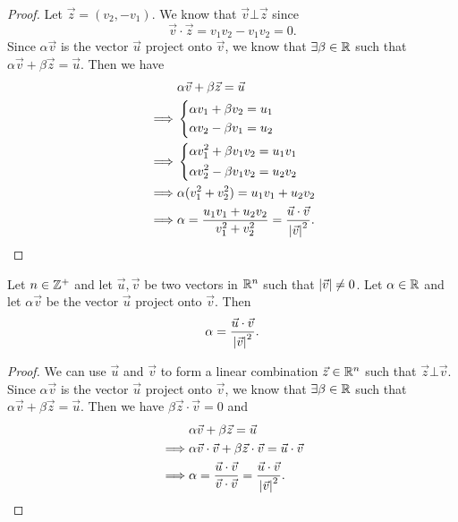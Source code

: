 \begin{proof}
  Let \(\vec{z} = (v_2, -v_1)\).
  We know that \(\vec{v} \bot \vec{z}\) since
  \[
    \vec{v} \cdot \vec{z} = v_1 v_2 - v_1 v_2 = 0.
  \]
  Since \(\alpha \vec{v}\) is the vector \(\vec{u}\) project onto \(\vec{v}\), we know that \(\exists \beta \in \mathbb{R}\) such that \(\alpha \vec{v} + \beta \vec{z} = \vec{u}\).
  Then we have
  \begin{align*}
             & \alpha \vec{v} + \beta \vec{z} = \vec{u}                                                            \\
    \implies & \begin{dcases}
                 \alpha v_1 + \beta v_2 = u_1 \\
                 \alpha v_2 - \beta v_1 = u_2
               \end{dcases}                                                                        \\
    \implies & \begin{dcases}
                 \alpha v_1^2 + \beta v_1 v_2 = u_1 v_1 \\
                 \alpha v_2^2 - \beta v_1 v_2 = u_2 v_2
               \end{dcases}                                                              \\
    \implies & \alpha (v_1^2 + v_2^2) = u_1 v_1 + u_2 v_2                                                          \\
    \implies & \alpha = \dfrac{u_1 v_1 + u_2 v_2}{v_1^2 + v_2^2} = \dfrac{\vec{u} \cdot \vec{v}}{\left\lvert\vec{v}\right\rvert^2}.
  \end{align*}
\end{proof}

\begin{ac}\label{ac:1.1.2}
  Let \(n \in \mathbb{Z}^+\) and let \(\vec{u}, \vec{v}\) be two vectors in \(\mathbb{R}^n\) such that \(\left\lvert\vec{v}\right\rvert \neq 0\).
  Let \(\alpha \in \mathbb{R}\) and let \(\alpha \vec{v}\) be the vector \(\vec{u}\) project onto \(\vec{v}\).
  Then
  \[
    \alpha = \dfrac{\vec{u} \cdot \vec{v}}{\left\lvert\vec{v}\right\rvert^2}.
  \]
\end{ac}

\begin{proof}
  We can use \(\vec{u}\) and \(\vec{v}\) to form a linear combination \(\vec{z} \in \mathbb{R}^n\) such that \(\vec{z} \bot \vec{v}\).
  Since \(\alpha \vec{v}\) is the vector \(\vec{u}\) project onto \(\vec{v}\), we know that \(\exists \beta \in \mathbb{R}\) such that \(\alpha \vec{v} + \beta \vec{z} = \vec{u}\).
  Then we have \(\beta \vec{z} \cdot \vec{v} = 0\) and
  \begin{align*}
             & \alpha \vec{v} + \beta \vec{z} = \vec{u}                                                                        \\
    \implies & \alpha \vec{v} \cdot \vec{v} + \beta \vec{z} \cdot \vec{v} = \vec{u} \cdot \vec{v}                              \\
    \implies & \alpha = \dfrac{\vec{u} \cdot \vec{v}}{\vec{v} \cdot \vec{v}} = \dfrac{\vec{u} \cdot \vec{v}}{\left\lvert\vec{v}\right\rvert^2}.
  \end{align*}
\end{proof}

